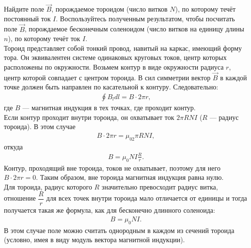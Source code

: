 \documentclass[__main__.tex]{subfiles}
\begin{document}
Найдите поле $\vec{B}$, порождаемое тороидом (число витков $N$), по которому течёт постоянный ток $I$. Воспользуйтесь полученным результатом, чтобы посчитать поле $\vec{B}$, порождаемое бесконечным соленоидом (число витков на единицу длины $n$), по которому течёт ток $I$.\\ 

Тороид представляет собой тонкий провод, навитый на каркас, имеющий форму тора. Он эквивалентен системе одинаковых круговых токов, центр которых расположены по окружности. Возьмем контур в виде окружности радиуса $r$, центр которой совпадает с центром тороида. В сил симметрии вектор $\vec{B}$ в каждой точке должен быть направлен по касательной к контуру. Следовательно:
\begin{gather*}
\oint B_ldl=B\cdot 2\pi r,
\end{gather*}
где $B$ --- магнитная индукция в тех точках, где проходит контур.\\
Если контур проходит внутри тороида, он охватывает ток $2\pi R NI$ ($R$ --- радиус тороида). В этом случае 
\begin{gather*}
B\cdot 2\pi r=\mu_02\pi RNI,
\end{gather*}
откуда 
\begin{gather*}
B=\mu_0NI\frac{R}{r}.
\end{gather*}
Контур, проходящий вне тороида, токов не охватывает, поэтому для него $B\cdot 2\pi r=0$. Таким образом, вне тороида магнитная индукция равна нулю.\\
Для тороида, радиус которого $R$ значительно превосходит радиус витка, отношение $\dfrac{R}{r}$ для всех точек внутри тороида мало отличается от единицы и тогда получается такая же формула, как для бесконечно длинного соленоида:
\begin{gather*}
B=\mu_0NI.
\end{gather*}
В этом случае поле можно считать однородным в каждом из сечений тороида (условно, имея в виду модуль вектора магнитной индукции).
\end{document}
